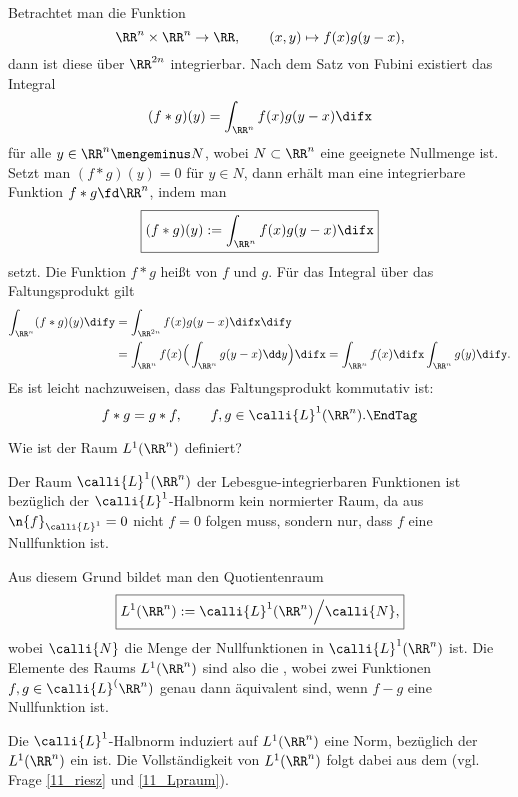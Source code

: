 \begin{antwort}
  Betrachtet man die Funktion 
  \[
  \RR^n \times \RR^n \to \RR, \qquad
  (x,y) \mapsto f(x) g(y-x),
  \]
  dann ist diese \"uber $\RR^{2n}$ integrierbar. Nach dem Satz von Fubini 
  existiert das Integral 
  \[
  (f \ast g)(y) = \int_{\RR^n} f(x)g(y-x) \difx
  \]
  f\"ur alle $y\in\RR^n \mengeminus N$, wobei $N\subset\RR^n$ 
  eine geeignete Nullmenge ist. Setzt man {\zB} $(f\ast g)(y)=0$ 
  f\"ur $y\in N$, dann erh\"alt man eine integrierbare Funktion 
  $f\ast g \fd \RR^n$, indem man 
  \[
  \boxed{
    (f \ast g)(y) := \int_{\RR^n} f(x)g(y-x) \difx} 
  \]
  setzt. 
  Die Funktion $f\ast g$ hei{\ss}t  von $f$ und $g$. 
  Für das Integral über das Faltungsprodukt gilt
  \begin{align*}
    \int_{\RR^n} (f\ast g)(y) \dify &=
    \int_{\RR^{2n}}  f(x) g(y-x) \difx \dify \\
    &= \int_{\RR^n} f(x) \Big( \int_{\RR^n} g(y-x) \dd y \Big) \difx 
    =
    \int_{\RR^{n}} f(x) \difx \int_{\RR^n} g(y)\dify.
  \end{align*}
  Es ist leicht nachzuweisen, dass das Faltungsprodukt 
  kommutativ ist: 
  \[
  f\ast g = g\ast f, \qquad f,g\in\calli{L}^1(\RR^n).
  \EndTag
  \]
\end{antwort} 

\begin{frage}
  Wie ist der Raum $L^1 ( \RR^n ) $ definiert?
\end{frage}

\begin{antwort}
  Der Raum $\calli{L}^1(\RR^n)$ der Lebesgue-integrierbaren 
  Funktionen ist bezüglich der $\calli{L}^1$-Halbnorm kein normierter 
  Raum, da aus $\n{f}_{\calli{L}^1}=0$ nicht $f=0$ folgen muss, 
  sondern nur, dass $f$ eine Nullfunktion ist. 

  Aus diesem Grund bildet man den Quotientenraum 
  \[ 
  \boxed{
    L^1( \RR^n ) : = \calli{L}^1 (\RR^n )\Big/ \calli{N},
  }
  \] 
  wobei $\calli{N}$ die Menge der Nullfunktionen in $\calli{L}^1(\RR^n)$ 
  ist. Die Elemente des Raums $L^1(\RR^n)$ sind also 
  die , 
  wobei zwei Funktionen $f, g \in \calli{L}^(\RR^n)$ genau dann äquivalent 
  sind, wenn $f-g$ eine Nullfunktion ist. 

  Die $\calli{L}^1$-Halbnorm induziert auf $L^1(\RR^n)$ 
  eine Norm, bezüglich der $L^1(\RR^n)$ ein  ist. 
  Die Vollständigkeit von $L^1(\RR^n)$ folgt dabei aus dem 
   (vgl. Frage \ref{11_riesz} und 
  \ref{11_Lpraum}).
  \AntEnd  
\end{antwort}



